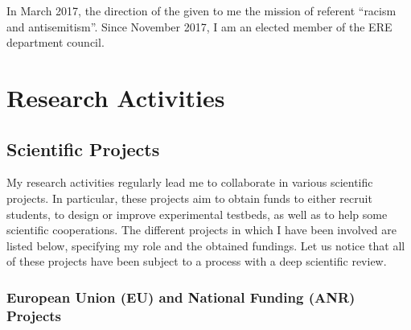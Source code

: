 In March 2017, the direction of the \INSA \CVL  given to me the mission of referent \enquote{racism and antisemitism}.
Since November 2017, I am an elected member of the ERE  department council.
 



\section{Research Activities}

\subsection{Scientific Projects}\label{sec:CV:projects}
My research activities regularly lead me to collaborate in various scientific projects.
In particular, these projects aim to obtain funds to either recruit \PhD students, to design or improve experimental testbeds, as well as to help some scientific cooperations.
The different projects in which I have been involved are listed below, specifying my role and the obtained fundings.
Let us notice that all of these  projects have been subject to a process with a deep scientific review.

\subsubsection[European Union  and National Funding Projects]{European Union (EU) and National Funding (ANR) Projects}


